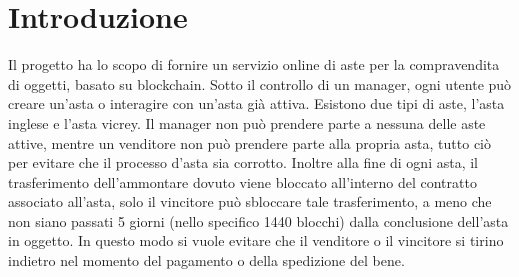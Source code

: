 \section{Introduzione}
Il progetto ha lo scopo di fornire un servizio online di aste per la compravendita di oggetti, basato su blockchain. Sotto il controllo di un manager, ogni utente può creare un'asta o interagire con un'asta già attiva. Esistono due tipi di aste, l'asta inglese e l'asta vicrey. Il manager non può prendere parte a nessuna delle aste attive, mentre un venditore non può prendere parte alla propria asta, tutto ciò per evitare che il processo d'asta sia corrotto. Inoltre alla fine di ogni asta, il trasferimento dell'ammontare dovuto viene bloccato all'interno del contratto associato all'asta, solo il vincitore può sbloccare tale trasferimento, a meno che non siano passati 5 giorni (nello specifico 1440 blocchi) dalla conclusione dell'asta in oggetto. In questo modo si vuole evitare che il venditore o il vincitore si tirino indietro nel momento del pagamento o della spedizione del bene.

